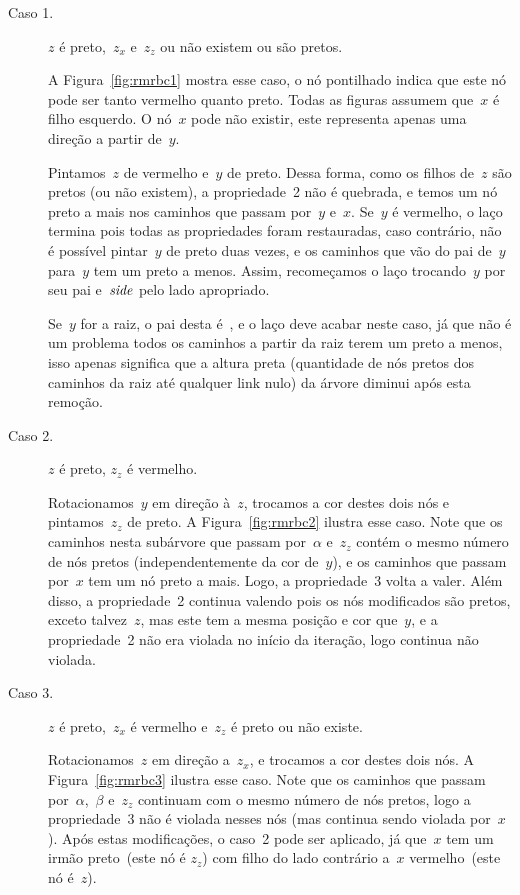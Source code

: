 \documentclass[../../main.tex]{subfiles}
\begin{document}
\begin{description}
	\item[Caso 1.] $z$ é preto,~$z_x$ e~$z_z$ ou não existem ou são pretos.

	A Figura~\ref{fig:rmrbc1} mostra esse caso, o nó pontilhado indica que este nó pode ser tanto vermelho quanto preto. Todas as figuras assumem que~$x$ é filho esquerdo. O nó~$x$ pode não existir, este representa apenas uma direção a partir de~$y$.

	Pintamos~$z$ de vermelho e~$y$ de preto. Dessa forma, como os filhos de~$z$ são pretos (ou não existem), a propriedade~2 não é quebrada, e temos um nó preto a mais nos caminhos que passam por~$y$ e~$x$. Se~$y$ é vermelho, o laço termina pois todas as propriedades foram restauradas, caso contrário, não é possível pintar~$y$ de preto duas vezes, e os caminhos que vão do pai de~$y$ para~$y$ tem um preto a menos. Assim, recomeçamos o laço trocando~$y$ por seu pai e~$\mathit{side}$ pelo lado apropriado.

	Se~$y$ for a raiz, o pai desta é~, e o laço deve acabar neste caso, já que não é um problema todos os caminhos a partir da raiz terem um preto a menos, isso apenas significa que a altura preta (quantidade de nós pretos dos caminhos da raiz até qualquer link nulo) da árvore diminui após esta remoção.

	\item[Caso 2.] $z$ é preto, $z_z$ é vermelho.

	Rotacionamos~$y$ em direção à~$z$, trocamos a cor destes dois nós e pintamos~$z_z$ de preto. A Figura~\ref{fig:rmrbc2} ilustra esse caso. Note que os caminhos nesta subárvore que passam por~$\alpha$ e~$z_z$ contém o mesmo número de nós pretos (independentemente da cor de~$y$), e os caminhos que passam por~$x$ tem um nó preto a mais. Logo, a propriedade~3 volta a valer. Além disso, a propriedade~2 continua valendo pois os nós modificados são pretos, exceto talvez~$z$, mas este tem a mesma posição e cor que~$y$, e a propriedade~2 não era violada no início da iteração, logo continua não violada.

	\item[Caso 3.] $z$ é preto,~$z_x$ é vermelho e~$z_z$ é preto ou não existe.

	Rotacionamos~$z$ em direção a~$z_x$, e trocamos a cor destes dois nós. A Figura~\ref{fig:rmrbc3} ilustra esse caso. Note que os caminhos que passam por~$\alpha$,~$\beta$ e~$z_z$ continuam com o mesmo número de nós pretos, logo a propriedade~3 não é violada nesses nós (mas continua sendo violada por~$x$). Após estas modificações, o caso~2 pode ser aplicado, já que~$x$ tem um irmão preto~(este nó é $z_z$) com filho do lado contrário a~$x$ vermelho~(este nó é~$z$).


\end{description}
\end{document}
